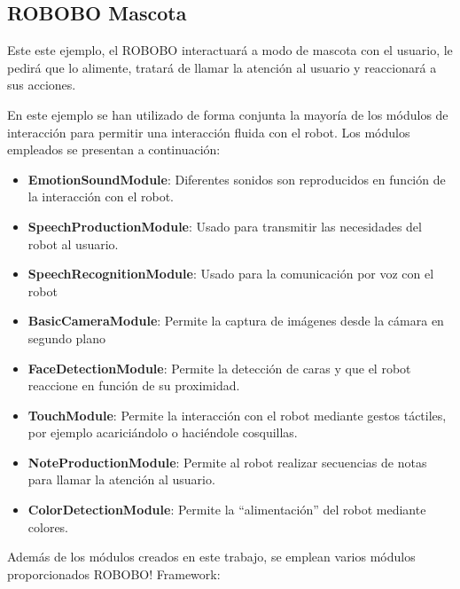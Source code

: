 \newpage

\subsection{ROBOBO Mascota}
\label{subsec:robobo-mascota}
Este este ejemplo, el ROBOBO interactuará a modo de mascota con el usuario, le pedirá que lo alimente, tratará de llamar la atención al usuario y reaccionará a sus acciones. 

En este ejemplo se han utilizado de forma conjunta la mayoría de los módulos de interacción para permitir una interacción fluida con el robot. Los módulos empleados se presentan a continuación:




\begin{itemize}
	\item \textbf{EmotionSoundModule}: Diferentes sonidos son reproducidos en función de la interacción con el robot.
	\item \textbf{SpeechProductionModule}: Usado para transmitir las necesidades del robot al usuario.
	\item \textbf{SpeechRecognitionModule}: Usado para la comunicación por voz con el robot
	\item \textbf{BasicCameraModule}: Permite la captura de imágenes desde la cámara en segundo plano
	\item \textbf{FaceDetectionModule}: Permite la detección de caras y que el robot reaccione en función de su proximidad.
	\item \textbf{TouchModule}: Permite la interacción con el robot mediante gestos táctiles, por ejemplo acariciándolo o haciéndole cosquillas.
	\item \textbf{NoteProductionModule}: Permite al robot realizar secuencias de notas para llamar la atención al usuario.
	\item \textbf{ColorDetectionModule}: Permite la \enquote{alimentación} del robot mediante colores.
	\end{itemize}

Además de los módulos creados en este trabajo, se emplean varios módulos proporcionados ROBOBO! Framework:

